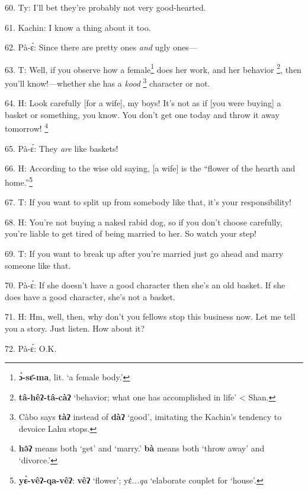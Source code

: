 60. Ty: I'll bet they're probably not very good-hearted.

61. Kachin: I know a thing about it too.

62. Pà-ɛ́: Since there are pretty ones \textit{and} ugly ones---

63. T: Well, if you observe how a female\footnote{\textbf{ɔ̀-sɛ̄-ma}, lit. `a female body.'} does her work, and her behavior
\footnote{\textbf{tâ-hêʔ-tâ-càʔ} `behavior; what one has accomplished in life' < Shan.}, then you'll know!---whether she has a \textit{kood }\footnote{Càbo says \textbf{tàʔ} instead of \textbf{dàʔ} `good', imitating the Kachin's tendency to devoice Lahu stops.} character or not.

64. H: Look carefully [for a wife], my boys! It's not as if [you were buying] a
basket or something, you know. You don't get one today and throw it away tomorrow!
\footnote{\textbf{hə̂ʔ} means both `get' and `marry.' \textbf{bà} means both `throw away' and `divorce.'}

65. Pà-ɛ́: They \textit{are} like baskets!

66. H: According to the wise old saying, [a wife] is the ``flower of the hearth
and home.''\footnote{\textbf{yɛ̀-vêʔ-qa-vêʔ}: \textbf{vêʔ} `flower'; yɛ\textit{̀...qa} `elaborate couplet for `house'.}

67. T: If you want to split up from somebody like that, it's your responsibility!

68. H: You're not buying a naked rabid dog, so if you don't choose carefully, you're
liable to get tired of being married to her. So watch your step!

69. T: If you want to break up after you're married just go ahead and marry
someone like that.

70. Pà-ɛ́: If she doesn't have a good character then she's an old basket. If
she does have a good character, she's not a basket.

71. H: Hm, well, then, why don't you fellows stop this business now. Let me tell
you a story. Just listen. How about it?

72. Pà-ɛ́: O.K.

